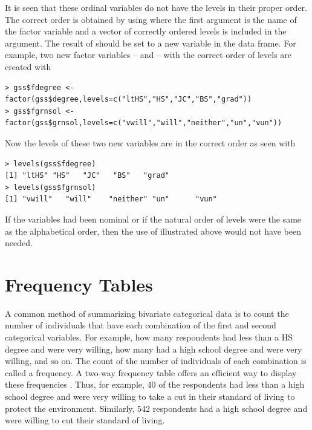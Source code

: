 \documentclass[10pt,openany]{book}\usepackage[]{graphicx}\usepackage[]{color}
\makeatletter
\newenvironment{kframe}{%
 \def\at@end@of@kframe{}%
 \ifinner\ifhmode%
  \def\at@end@of@kframe{\end{minipage}}%
  \begin{minipage}{\columnwidth}%
 \fi\fi%
 \def\FrameCommand##1{\hskip\@totalleftmargin \hskip-\fboxsep
 \colorbox{shadecolor}{##1}\hskip-\fboxsep
     \hskip-\linewidth \hskip-\@totalleftmargin \hskip\columnwidth}%
 \MakeFramed {\advance\hsize-\width
   \@totalleftmargin\z@ \linewidth\hsize
   \@setminipage}}%
 {\par\unskip\endMakeFramed%
 \at@end@of@kframe}
\newenvironment{knitrout}{}{} %
\makeatother
\begin{document}
It is seen that these ordinal variables do not have the levels in their proper order.  The correct order is obtained by using  where the first argument is the name of the factor variable and a vector of correctly ordered levels is included in the  argument.  The result of  should be set to a new variable in the data frame.  For example, two new factor variables --  and  -- with the correct order of levels are created with
\begin{knitrout}
\color{fgcolor}\begin{kframe}
\begin{verbatim}
> gss$fdegree <- factor(gss$degree,levels=c("ltHS","HS","JC","BS","grad"))
> gss$fgrnsol <- factor(gss$grnsol,levels=c("vwill","will","neither","un","vun"))
\end{verbatim}
\end{kframe}
\end{knitrout}
Now the levels of these two new variables are in the correct order as seen with
\begin{knitrout}
\color{fgcolor}\begin{kframe}
\begin{verbatim}
> levels(gss$fdegree)
[1] "ltHS" "HS"   "JC"   "BS"   "grad"
> levels(gss$fgrnsol)
[1] "vwill"   "will"    "neither" "un"      "vun"    
\end{verbatim}
\end{kframe}
\end{knitrout}
If the variables had been nominal or if the natural order of levels were the same as the alphabetical order, then the use of  illustrated above would not have been needed.



\section{Frequency Tables}
\vspace{-12pt}

A common method of summarizing bivariate categorical data is to count the number of individuals that have each combination of the first and second categorical variables.  For example, how many respondents had less than a HS degree and were very willing, how many had a high school degree and were very willing, and so on.  The count of the number of individuals of each combination is called a frequency.  A two-way frequency table offers an efficient way to display these frequencies .  Thus, for example, 40 of the respondents had less than a high school degree and were very willing to take a cut in their standard of living to protect the environment.  Similarly, 542 respondents had a high school degree and were willing to cut their standard of living.
\end{document}
